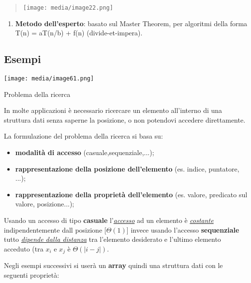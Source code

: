 \begin{quote}
\texttt{[image: media/image22.png]}
\end{quote}

\begin{enumerate}
\def\labelenumi{\arabic{enumi}.}
\setcounter{enumi}{2}
\item
  \textbf{Metodo dell'esperto}: basato sul Master Theorem, per algoritmi
  della forma T(n) = aT(n/b) + f(n) (divide-et-impera).
\end{enumerate}

\subsection{Esempi}\label{esempi-1}

\texttt{[image: media/image61.png]}

Problema della ricerca

In molte applicazioni è necessario ricercare un elemento all'interno di
una struttura dati senza saperne la posizione, o non potendovi accedere
direttamente.

La formulazione del problema della ricerca si basa su:

\begin{itemize}
\item
  \textbf{modalità di accesso} (casuale,sequenziale,...);
\item
  \textbf{rappresentazione della posizione dell'elemento} (es. indice,
  puntatore, ...);
\item
  \textbf{rappresentazione della proprietà dell'elemento} (es. valore,
  predicato sul valore, posizione...);
\end{itemize}

Usando un accesso di tipo \textbf{casuale} l'\emph{\ul{accesso}} ad un
elemento è \emph{\ul{costante}} indipendentemente dall posizione
{[}\(\Theta(1)\){]} invece usando l'accesso \textbf{sequenziale} tutto
\emph{\ul{dipende dalla distanza}} tra l'elemento desiderato e l'ultimo
elemento acceduto (tra \(x_{i}\) e \(x_{j}\) è \(\Theta(|i - j|)\).

Negli esempi successivi si userà un \textbf{array} quindi una struttura
dati con le seguenti proprietà:

